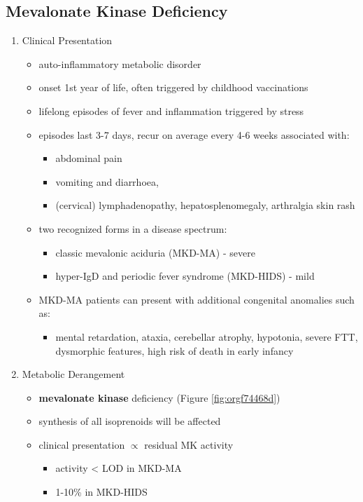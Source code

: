 \documentclass[12pt]{scrartcl}
\begin{document}
\subsection{Mevalonate Kinase Deficiency}
\label{sec:org8be31ad}
\begin{enumerate}
\item Clinical Presentation
\label{sec:org9b21cfd}
\begin{itemize}
\item auto-inflammatory metabolic disorder
\item onset 1st year of life, often triggered by childhood vaccinations
\item lifelong episodes of fever and inflammation triggered by stress
\item episodes last 3-7 days, recur on average every 4-6 weeks associated with:
\begin{itemize}
\item abdominal pain
\item vomiting and diarrhoea,
\item (cervical) lymphadenopathy, hepatosplenomegaly, arthralgia skin rash
\end{itemize}
\item two recognized forms in a disease spectrum:
\begin{itemize}
\item classic mevalonic aciduria (MKD-MA) - severe
\item hyper-IgD and periodic fever syndrome (MKD-HIDS) - mild
\end{itemize}

\item MKD-MA patients can present with additional congenital anomalies
such as:
\begin{itemize}
\item mental retardation, ataxia, cerebellar atrophy, hypotonia, severe
FTT, dysmorphic features, high risk of death in early infancy
\end{itemize}
\end{itemize}

\item Metabolic Derangement
\label{sec:orga8ceb9f}
\begin{itemize}
\item \textbf{mevalonate kinase} deficiency (Figure \ref{fig:orgf74468d})
\end{itemize}
\begin{itemize}
\item synthesis of all isoprenoids will be affected
\item clinical presentation \(\propto\) residual MK activity
\begin{itemize}
\item activity < LOD in MKD-MA
\item 1-10\% in MKD-HIDS
\end{itemize}
\end{itemize}


\end{enumerate}
\end{document}
